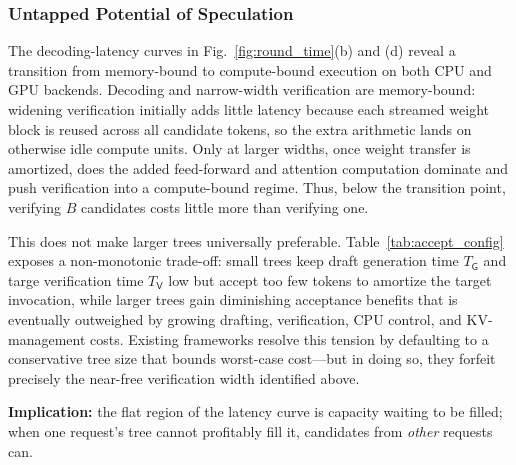 \documentclass[sigconf,nonacm,10pt]{acmart}
\begin{document}
\subsubsection{Untapped Potential of Speculation}
\label{sec:motivation_speculation}
The decoding-latency curves in Fig.~\ref{fig:round_time}(b) and (d) reveal a transition from memory-bound to compute-bound execution on both CPU and GPU backends. Decoding and narrow-width verification are memory-bound: widening verification initially adds little latency because each streamed weight block is reused across all candidate tokens, so the extra arithmetic lands on otherwise idle compute units. Only at larger widths, once weight transfer is amortized, does the added feed-forward and attention computation dominate and push verification into a compute-bound regime. Thus, below the transition point, verifying $B$ candidates costs little more than verifying one.


This does not make larger trees universally preferable. Table~\ref{tab:accept_config} exposes a non-monotonic trade-off: small trees keep {\color{red}draft generation time $T_{\mathsf G}$ and targe verification time $T_{\mathsf V}$} low but accept too few tokens to amortize the target invocation, while larger trees gain diminishing acceptance benefits that is eventually outweighed by growing drafting, verification, CPU control, and KV-management costs. Existing frameworks resolve this tension by defaulting to a conservative tree size that bounds worst-case cost---but in doing so, they forfeit precisely the near-free verification width identified above. 

\noindent\textbf{Implication:} the flat region of the latency curve is capacity waiting to be filled; when one request's tree cannot profitably fill it, candidates from \emph{other} requests can.
\end{document}
